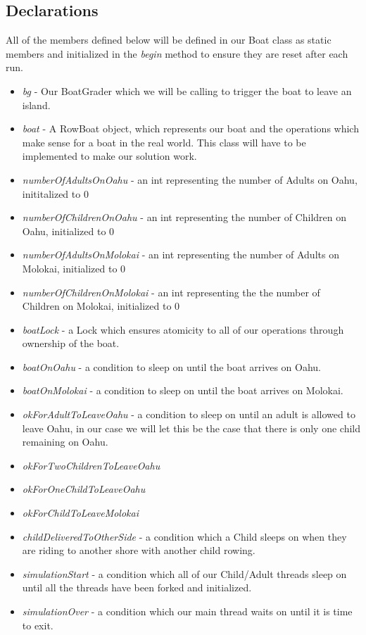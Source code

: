 \documentclass{article}
\begin{document}
\subsection*{Declarations}
All of the members defined below will be defined in our Boat class as static members and initialized in the
\textit{begin} method to ensure they are reset after each run.
\begin{itemize}
\item \textit{bg} - Our BoatGrader which we will be calling to trigger the boat to leave an island.
\item \textit{boat} - A RowBoat object, which represents our boat and the operations which make sense for a boat
in the real world. This class will have to be implemented to make our solution work.
\item \textit{numberOfAdultsOnOahu} - an int representing the number of Adults on Oahu, inititalized to 0
\item \textit{numberOfChildrenOnOahu} - an int representing the number of Children on Oahu, initialized to 0
\item \textit{numberOfAdultsOnMolokai} - an int representing the number of Adults on Molokai, initialized to 0
\item \textit{numberOfChildrenOnMolokai} - an int representing the the number of Children on Molokai, initialized to 0
\item \textit{boatLock} - a Lock which ensures atomicity to all of our operations through ownership of the boat.
\item \textit{boatOnOahu} - a condition to sleep on until the boat arrives on Oahu.
\item \textit{boatOnMolokai} - a condition to sleep on until the boat arrives on Molokai.
\item \textit{okForAdultToLeaveOahu} - a condition to sleep on until an adult is allowed to leave Oahu, in our case we
will let this be the case that there is only one child remaining on Oahu.
\item \textit{okForTwoChildrenToLeaveOahu}
\item \textit{okForOneChildToLeaveOahu}
\item \textit{okForChildToLeaveMolokai}
\item \textit{childDeliveredToOtherSide} - a condition which a Child sleeps on when they are riding to another shore
with another child rowing.
\item \textit{simulationStart} - a condition which all of our Child/Adult threads sleep on until all the threads have
been forked and initialized.
\item \textit{simulationOver} - a condition which our main thread waits on until it is time to exit.
\end{itemize}
\end{document}

